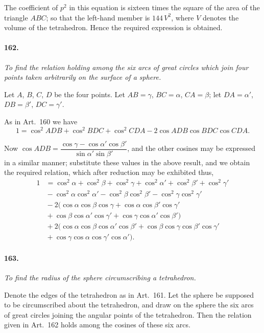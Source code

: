 \documentclass{book}[2004/02/16]
\begin{document}
\begin{mainmatter}
\begin{spacing}{1.3}
The coefficient of $p^2$ in this equation is sixteen times the
square of the area of the triangle $ABC$; so that the left-hand
member is $144\,V^2$, where $V$ denotes the volume of the tetrahedron.
Hence the required expression is obtained.


\paragraph{162.} \textit{To find the relation holding among the six arcs of great
circles which join four points taken arbitrarily on the surface of a
sphere.}

Let $A$, $B$, $C$, $D$ be the four points. Let $AB=\gamma$, $BC=\alpha$,
$CA=\beta$; let $DA=\alpha'$, $DB=\beta'$, $DC=\gamma'$.

As in Art.\ 160 we have
\[
1=\cos^2{ADB}+\cos^2{BDC}+\cos^2{CDA}-2\cos{ADB}\cos{BDC}\cos{CDA}.
\]

Now $\cos{ADB}=\dfrac{\cos{\gamma}-\cos{\alpha'}\cos{\beta'}} {\sin{\alpha'}\sin{\beta}'}$, and the other cosines
may be expressed in a similar manner; substitute these values in
the above result, and we obtain the required relation, which after
reduction may be exhibited thus,
\begin{align*}
1 &= \cos^2{\alpha} +\cos^2{\beta} +\cos^2{\gamma}
   + \cos^2{\alpha'}+\cos^2{\beta'}+\cos^2{\gamma'}
\\
&{} - \cos^2{\alpha}\cos^2{\alpha'}
    - \cos^2{\beta} \cos^2{\beta'}
    - \cos^2{\gamma}\cos^2{\gamma'}
\\
&{} - 2( \cos{\alpha}\cos{\beta} \cos{\gamma}
    + \cos{\alpha}\cos{\beta'}\cos{\gamma'}
\\
&{} + \cos{\beta} \cos{\alpha'}\cos{\gamma'}
    + \cos{\gamma}\cos{\alpha'}\cos{\beta'} )
\\
&{} + 2( \cos{\alpha}\cos{\beta}\cos{\alpha'}\cos{\beta'}
    + \cos{\beta}\cos{\gamma}\cos{\beta'}\cos{\gamma'}
\\
&{} + \cos{\gamma}\cos{\alpha}\cos{\gamma'}\cos{\alpha'} ).
\end{align*}

\paragraph{163.} \textit{To find the radius of the sphere circumscribing a tetrahedron.}

Denote the edges of the tetrahedron as in Art.~161. Let the
sphere be supposed to be circumscribed about the tetrahedron,
and draw on the sphere the six arcs of great circles joining the
angular points of the tetrahedron. Then the relation given in
Art.~162 holds among the cosines of these six arcs.


\end{spacing}
\end{mainmatter}
\end{document}
